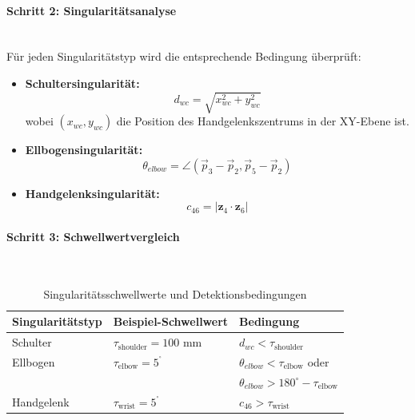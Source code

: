 \paragraph{Schritt 2: Singularitätsanalyse}~\\
Für jeden Singularitätstyp wird die entsprechende Bedingung überprüft:
\begin{itemize}
	\item \textbf{Schultersingularität:}
	      \begin{equation}
		      d_{wc} = \sqrt{x_{wc}^2 + y_{wc}^2}
	      \end{equation}
	      wobei $(x_{wc}, y_{wc})$ die Position des Handgelenkszentrums in der XY-Ebene ist.

	\item \textbf{Ellbogensingularität:}
	      \begin{equation}
		      \theta_{elbow} = \angle(\vec{p}_3 - \vec{p}_2, \vec{p}_5 - \vec{p}_2)
	      \end{equation}

	\item \textbf{Handgelenksingularität:}
	      \begin{equation}
		      c_{46} = |\mathbf{z}_4 \cdot \mathbf{z}_6|
	      \end{equation}
\end{itemize}

\paragraph{Schritt 3: Schwellwertvergleich}~\\
\begin{table}[H]
	\centering
	\begin{tabular}{l l l}
		\hline
		\textbf{Singularitätstyp} & \textbf{Beispiel-Schwellwert}      & \textbf{Bedingung}                            \\
		\hline
		Schulter                  & $\tau_{\text{shoulder}} = 100$ mm  & $d_{wc} < \tau_{\text{shoulder}}$             \\
		Ellbogen                  & $\tau_{\text{elbow}} = 5^{^\circ}$ & $\theta_{elbow} < \tau_{\text{elbow}}$ oder   \\
		                          &                                    & $\theta_{elbow} > 180^\circ - \tau_{\text{elbow}}$ \\
		Handgelenk                & $\tau_{\text{wrist}} = 5^{^\circ}$ & $c_{46} > \tau_{\text{wrist}}$                \\
		\hline
	\end{tabular}
	\caption{Singularitätsschwellwerte und Detektionsbedingungen}
	\label{tab:singularity_thresholds}
\end{table}

